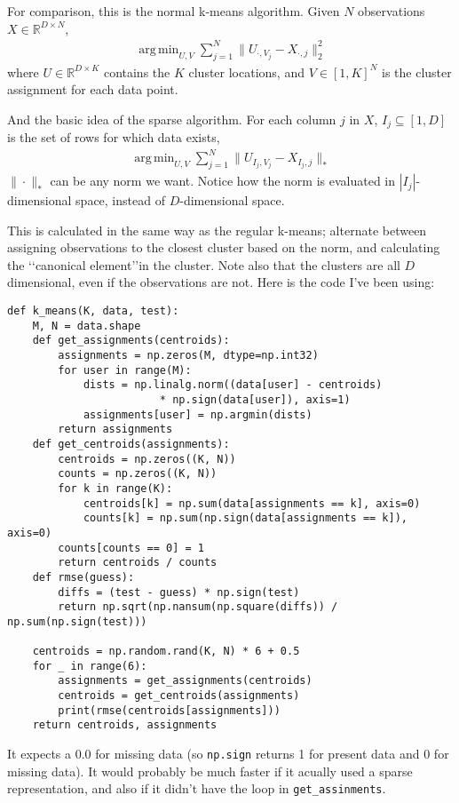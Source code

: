 \documentclass{article}
\DeclareMathOperator*{\argmin}{arg\,min}
\newcommand{\Reals}{\mathbb{R}}
\begin{document}
For comparison, this is the normal k-means algorithm. Given $N$ observations $X \in \Reals^{D\times N}$,
\begin{gather*}
\argmin_{U,V} \sum_{j=1}^N \|U_{\cdot,V_j} - X_{\cdot,j}\|_2^2
\end{gather*}
where $U\in\Reals^{D\times K}$ contains the $K$ cluster locations, and $V \in [1,K]^N$ is the cluster assignment for each data point. 

And the basic idea of the sparse algorithm. For each column $j$ in $X$, $I_j \subseteq [1,D]$ is the set of rows for which data exists,
\begin{gather*}
\argmin_{U,V} \sum_{j=1}^N \|U_{I_j,V_j} - X_{I_j,j}\|_*
\end{gather*}
$\|\cdot\|_*$ can be any norm we want. Notice how the norm is evaluated in $|I_j|$-dimensional space, instead of $D$-dimensional space.

This is calculated in the same way as the regular k-means; alternate between assigning observations to the closest cluster based on the norm, and calculating the \lq\lq canonical element\rq\rq in the cluster. Note also that the clusters are all $D$ dimensional, even if the observations are not. Here is the code I've been using:
\begin{lstlisting}
def k_means(K, data, test):
    M, N = data.shape
    def get_assignments(centroids):
        assignments = np.zeros(M, dtype=np.int32)
        for user in range(M):
            dists = np.linalg.norm((data[user] - centroids)
                        * np.sign(data[user]), axis=1)
            assignments[user] = np.argmin(dists)
        return assignments
    def get_centroids(assignments):
        centroids = np.zeros((K, N))
        counts = np.zeros((K, N))
        for k in range(K):
            centroids[k] = np.sum(data[assignments == k], axis=0)
            counts[k] = np.sum(np.sign(data[assignments == k]), axis=0)
        counts[counts == 0] = 1
        return centroids / counts
    def rmse(guess):
        diffs = (test - guess) * np.sign(test)
        return np.sqrt(np.nansum(np.square(diffs)) / np.sum(np.sign(test)))
    
    centroids = np.random.rand(K, N) * 6 + 0.5
    for _ in range(6):
        assignments = get_assignments(centroids)
        centroids = get_centroids(assignments)
        print(rmse(centroids[assignments]))
    return centroids, assignments
\end{lstlisting}
It expects a 0.0 for missing data (so \texttt{np.sign} returns 1 for present data and 0 for missing data). It would probably be much faster if it acually used a sparse representation, and also if it didn't have the loop in \texttt{get\_assinments}.
\end{document}
